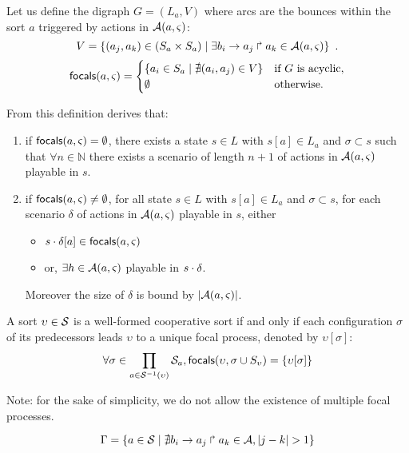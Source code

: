\begin{definition}
Let us define the digraph $G = (L_a, V)$ where arcs are the bounces within the sort $a$
triggered by actions in $\mathcal{A}(a,\varsigma)$:
\[V = \{(a_j,a_k)\in (S_a \times S_a) \mid 
			\exists b_i\rightarrow a_j\Rsh a_k\in \mathcal{A}(a,\varsigma)\}\enspace.\]
\[
\mathsf{focals}(a,\varsigma) = 
\begin{cases}
\{ a_i \in S_a \mid \nexists (a_i,a_j)\in V\} & \text{if $G$ is acyclic},\\
\emptyset & \text{otherwise.}\\
\end{cases}
\]
\end{definition}
From this definition derives that:
\begin{enumerate}
\item if $\mathsf{focals}(a,\varsigma)=\emptyset$, there exists a 
state $s\in L$ with $s[a]\in L_a$ and $\sigma\subset s$
such that $\forall n\in\mathbb N$ there 
exists a scenario of length $n+1$ of actions in $\mathcal{A}(a,\varsigma)$ playable in $s$.
\item if $\mathsf{focals}(a,\varsigma)\neq\emptyset$, for all
state $s\in L$ with $s[a]\in L_a$ and $\sigma\subset s$, for each scenario $\delta$ of actions in
$\mathcal{A}(a,\varsigma)$ playable in $s$,
either
\begin{itemize}
\item $s\cdot\delta[a] \in \mathsf{focals}(a,\varsigma)$
\item or, $\exists h\in \mathcal{A}(a,\varsigma)$ playable in $s\cdot\delta$.
\end{itemize}
Moreover the size of $\delta$ is bound by $|\mathcal{A}(a,\varsigma)|$.
\end{enumerate}
\begin{property}
A sort $\upsilon\in\mathcal{S}$ is a well-formed cooperative sort if and only if
each configuration $\sigma$ of its predecessors leads $\upsilon$ to a unique focal process,
denoted by $\upsilon[\sigma]$:
\[
\forall \sigma \in \prod_{a\in\mathcal{S}^{-1}(\upsilon)} \mathcal{S}_{a},
\mathsf{focals}(\upsilon,\sigma\cup S_\upsilon) = \{ \upsilon[\sigma] \}\]
\end{property}
Note: for the sake of simplicity, we do not allow the existence of multiple focal processes.

\begin{equation}
\Gamma = \{a \in \mathcal{S} \mid \nexists b_i\rightarrow a_j\Rsh a_k \in \mathcal{A}, |j - k| > 1\} \\
\label{eq:PH-components}
\end{equation}


